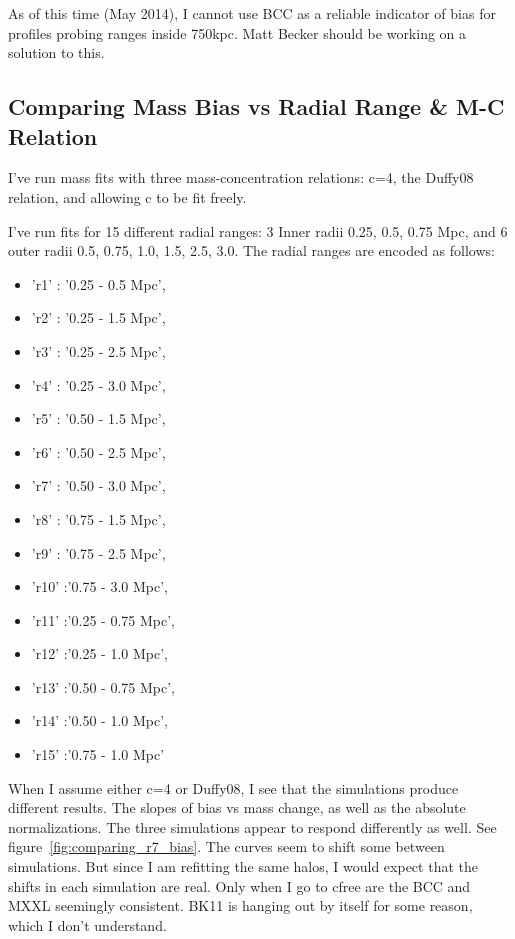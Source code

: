 \documentclass[11pt]{article}
\begin{document}
As of this time (May 2014), I cannot use BCC as a reliable indicator of bias for profiles probing ranges inside 750kpc.
Matt Becker should be working on a solution to this.


\subsection{Comparing Mass Bias vs Radial Range \& M-C Relation}
\label{sec:consistant_bias_mcrelation}

I've run mass fits with three mass-concentration relations: c=4, the Duffy08 relation, and allowing c to be fit freely.

I've run fits for 15 different radial ranges: 3 Inner radii {0.25, 0.5, 0.75 Mpc}, and 6 outer radii {0.5, 0.75, 1.0, 1.5, 2.5, 3.0}. The radial ranges are encoded as follows:

\begin{itemize}
\item 'r1' : '0.25 - 0.5 Mpc',
\item 'r2' : '0.25 - 1.5 Mpc',
\item 'r3' : '0.25 - 2.5 Mpc',
\item 'r4' : '0.25 - 3.0 Mpc',
\item 'r5' : '0.50 - 1.5 Mpc',
\item 'r6' : '0.50 - 2.5 Mpc',
\item 'r7' : '0.50 - 3.0 Mpc',
\item 'r8' : '0.75 - 1.5 Mpc',
\item 'r9' : '0.75 - 2.5 Mpc',
\item 'r10' :'0.75 - 3.0 Mpc',
\item 'r11' :'0.25 - 0.75 Mpc',
\item 'r12' :'0.25 - 1.0 Mpc',
\item 'r13' :'0.50 - 0.75 Mpc',
\item 'r14' :'0.50 - 1.0 Mpc',
\item 'r15' :'0.75 - 1.0 Mpc'
\end{itemize}


When I assume either c=4 or Duffy08, I see that the simulations produce different results. The slopes of bias vs mass change, as well as the absolute normalizations. The three simulations appear to respond differently as well. See figure~\ref{fig:comparing_r7_bias}. The curves seem to shift some between simulations. But since I am refitting the same halos, I would expect that the shifts in each simulation are real. Only when I go to cfree are the BCC and MXXL seemingly consistent. BK11 is hanging out by itself for some reason, which I don't understand.
\end{document}

